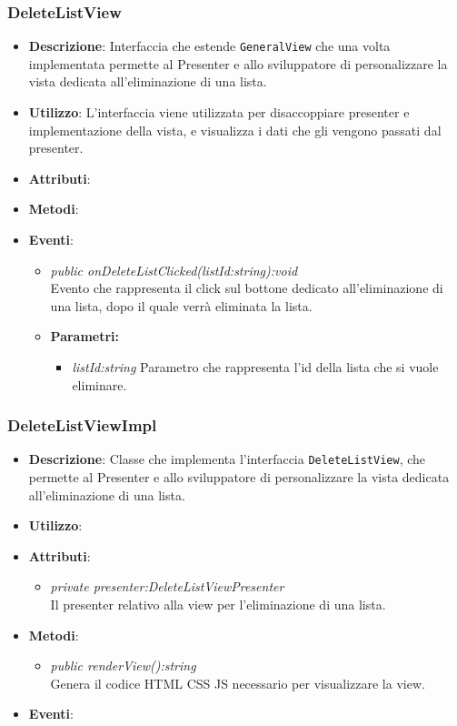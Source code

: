 \subsubsection{DeleteListView}
\begin{itemize}
\item \textbf{Descrizione}: Interfaccia che estende \texttt{GeneralView} che una volta implementata permette al Presenter e allo sviluppatore di personalizzare la vista dedicata all'eliminazione di una lista.
\item \textbf{Utilizzo}: L'interfaccia viene utilizzata per disaccoppiare presenter e implementazione della vista, e visualizza i dati che gli vengono passati dal presenter.
\item \textbf{Attributi}: 
\item \textbf{Metodi}:
\item \textbf{Eventi}:
	\begin{itemize}
	\item \textit{public onDeleteListClicked(listId:string):void}\\
	Evento che rappresenta il click sul bottone dedicato all'eliminazione di una lista, dopo il quale verrà eliminata la lista.
	\item{\textbf{Parametri:} \begin{itemize}
	\item \textit{listId:string}
	Parametro che rappresenta l'id della lista che si vuole eliminare.
	\end{itemize}}
	\end{itemize}
\end{itemize}

\subsubsection{DeleteListViewImpl}
\begin{itemize}
\item \textbf{Descrizione}: Classe che implementa l'interfaccia \texttt{DeleteListView}, che permette al Presenter e allo sviluppatore di personalizzare la vista dedicata all'eliminazione di una lista.
\item \textbf{Utilizzo}:
\item \textbf{Attributi}: 
	\begin{itemize}
	\item \textit{private presenter:DeleteListViewPresenter}\\
		Il presenter relativo alla view per l'eliminazione di una lista.
	\end{itemize}
\item \textbf{Metodi}:
	\begin{itemize}
	\item \textit{public renderView():string}\\
			Genera il codice HTML CSS JS necessario per visualizzare la view.
	\end{itemize}
\item \textbf{Eventi}:
\end{itemize}

